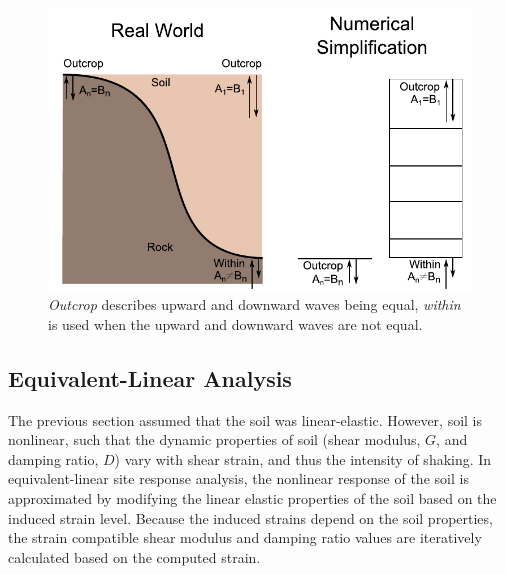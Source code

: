 \documentclass[11pt]{report}
\begin{document}
\begin{figure}[tb]
  \begin{center}
	\includegraphics[width=0.7\linewidth]{figures/siteResponse/withinOutcrop.pdf}
  \end{center}
  \caption{\emph{Outcrop} describes upward and downward waves being equal, \emph{within} is used
  when the upward and downward waves are not equal.}
  \label{fig:siteResponse:outcropWithin}
\end{figure}
\clearpage

\subsection{Equivalent-Linear Analysis}\label{ch:siteResponse:equivLinear}
The previous section assumed that the soil was linear-elastic. However, soil is nonlinear, such that
the dynamic properties of soil (shear modulus, $G$, and damping ratio, $D$) vary with shear strain, and
thus the intensity of shaking.  In equivalent-linear site response analysis, the nonlinear response
of the soil is approximated by modifying the linear elastic properties of the soil based on the
induced strain level.  Because the induced strains depend on the soil properties, the strain
compatible shear modulus and damping ratio values are iteratively calculated based on the computed
strain.  
\end{document}
